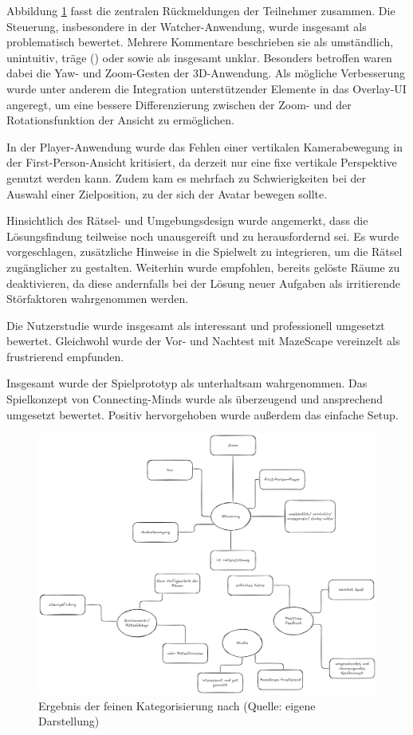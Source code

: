 Abbildung \ref{fig:qualitative-results-end} fasst die zentralen Rückmeldungen der Teilnehmer zusammen. Die Steuerung, insbesondere in der Watcher-Anwendung, wurde insgesamt als problematisch bewertet. Mehrere Kommentare beschrieben sie als umständlich, unintuitiv, träge () oder  sowie als insgesamt unklar. Besonders betroffen waren dabei die Yaw- und Zoom-Gesten der \ac{3D}-Anwendung. Als mögliche Verbesserung wurde unter anderem die Integration unterstützender Elemente in das Overlay-\ac{UI} angeregt, um eine bessere Differenzierung zwischen der Zoom- und der Rotationsfunktion der Ansicht zu ermöglichen.

In der Player-Anwendung wurde das Fehlen einer vertikalen Kamerabewegung in der First-Person-Ansicht kritisiert, da derzeit nur eine fixe vertikale Perspektive genutzt werden kann. Zudem kam es mehrfach zu Schwierigkeiten bei der Auswahl einer Zielposition, zu der sich der Avatar bewegen sollte.

Hinsichtlich des Rätsel- und Umgebungsdesign wurde angemerkt, dass die Lösungsfindung teilweise noch unausgereift und zu herausfordernd sei. Es wurde vorgeschlagen, zusätzliche Hinweise in die Spielwelt zu integrieren, um die Rätsel zugänglicher zu gestalten. Weiterhin wurde empfohlen, bereits gelöste Räume zu deaktivieren, da diese andernfalls bei der Lösung neuer Aufgaben als irritierende Störfaktoren wahrgenommen werden. 

Die Nutzerstudie wurde insgesamt als interessant und professionell umgesetzt bewertet. Gleichwohl wurde der Vor- und Nachtest mit MazeScape vereinzelt als frustrierend empfunden.

Insgesamt wurde der Spielprototyp als unterhaltsam wahrgenommen. Das Spielkonzept von Connecting-Minds wurde als überzeugend und ansprechend umgesetzt bewertet. Positiv hervorgehoben wurde außerdem das einfache Setup.

\begin{figure}[ht]
\centering
\includegraphics[width=1\linewidth]{content/pictures/Qualitative-Auswertung-Schritt-2.png}
\caption{Ergebnis der feinen Kategorisierung nach \cite{braun_using_2006} (Quelle: eigene Darstellung)}
\label{fig:qualitative-results-end}
\end{figure}

